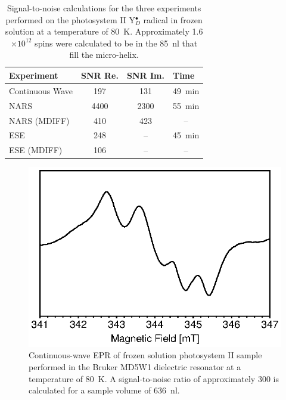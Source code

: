 \begin{table}[htb]
\centering
\caption[Signal-to-noise calculations.]{Signal-to-noise calculations for the three experiments performed on the photosystem II Y$_D^\bullet$ radical in frozen solution at a temperature of 80~K. Approximately 1.6$\times10^{12}$ spins were calculated to be in the 85~nl that fill the micro-helix.}
\begin{tabular}{llll}
\multicolumn{1}{l|}{Experiment} & \multicolumn{1}{l|}{SNR Re.} & \multicolumn{1}{l|}{SNR Im.} & Time\\ \hline\hline
\multicolumn{1}{l|}{Continuous Wave} & \multicolumn{1}{c|}{197} & \multicolumn{1}{c|}{131} & \multicolumn{1}{c}{49~min} \\\hline
\multicolumn{1}{l|}{NARS} & \multicolumn{1}{c|}{4400} & \multicolumn{1}{c|}{2300} & \multicolumn{1}{c}{55~min} \\\hline
\multicolumn{1}{l|}{NARS (MDIFF)} & \multicolumn{1}{c|}{410} & \multicolumn{1}{c|}{423} & \multicolumn{1}{c}{--} \\\hline
\multicolumn{1}{l|}{ESE} & \multicolumn{1}{c|}{248} & \multicolumn{1}{c|}{--} & \multicolumn{1}{c}{45~min} \\\hline
\multicolumn{1}{l|}{ESE (MDIFF)} & \multicolumn{1}{c|}{106} & \multicolumn{1}{c|}{--} & \multicolumn{1}{c}{--}\\
\end{tabular}\label{table:snrcalc}
\end{table}

\begin{figure}[htb]
\centering
\includegraphics{Kapitel/Appendix/Images/S5-BBYMD5.eps}
\caption[CW EPR of frozen solution photosystem II in the Bruker MD5W1.]{Continuous-wave EPR of frozen solution photosystem II sample performed in the Bruker MD5W1 dielectric resonator at a temperature of 80~K. A signal-to-noise ratio of approximately 300 is calculated for a sample volume of 636~nl.}
\label{fig:BBYMD5}
\end{figure}

